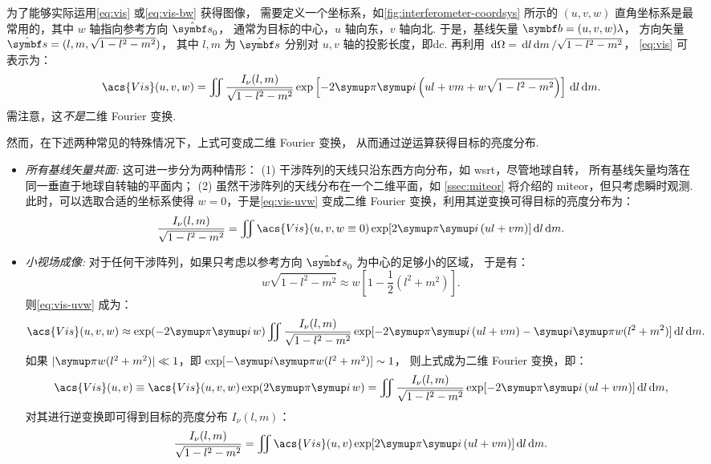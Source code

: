 为了能够实际运用\autoref{eq:vis} 或\autoref{eq:vis-bw} 获得图像，
需要定义一个坐标系，如\autoref{fig:interferometer-coordsys}
所示的 $(u,v,w)$ 直角坐标系是最常用的，其中 $w$ 轴指向参考方向 $\hat{\B{s}}_0$，
通常为目标的中心，$u$ 轴向东，$v$ 轴向北.
于是，基线矢量 $\B{b} = (u,v,w) \lambda$，
方向矢量 $\hat{\B{s}} = (l,m,\sqrt{1-l^2-m^2})$，
其中 $l, m$ 为 $\hat{\B{s}}$ 分别对 $u, v$ 轴的投影长度，即\ac{dc}.
再利用 $\,\mathrm{d}\Omega = \,\mathrm{d}l\,\mathrm{d}m \,/ \sqrt{1-l^2-m^2}$，
\autoref{eq:vis} 可表示为：
\begin{equation}
  \label{eq:vis-uvw}
  \acs{Vis}(u,v,w) = \iint \frac{I_{\nu}(l,m)}{\sqrt{1-l^2-m^2}}
    \exp \left[ -2\Cpi\Ci \left( ul+vm+w\sqrt{1-l^2-m^2} \right) \right]
    \D{l}\D{m}.
\end{equation}
需注意，这\emph{不是}二维 Fourier 变换.

然而，在下述两种常见的特殊情况下，上式可变成二维 Fourier 变换，
从而通过逆运算获得目标的亮度分布.
\begin{itemize}
\item
\emph{所有基线矢量共面:}
这可进一步分为两种情形：
(1) 干涉阵列的天线只沿东西方向分布，如 \ac{wsrt}，尽管地球自转，
所有基线矢量均落在同一垂直于地球自转轴的平面内；
(2) 虽然干涉阵列的天线分布在一个二维平面，如 \autoref{ssec:miteor}
将介绍的 \ac*{miteor}，但只考虑瞬时观测.
此时，可以选取合适的坐标系使得 $w = 0$，于是\autoref{eq:vis-uvw}
变成二维 Fourier 变换，利用其逆变换可得目标的亮度分布为：
\begin{equation}
  \label{eq:vis-inv1}
  \frac{I_{\nu}(l,m)}{\sqrt{1-l^2-m^2}} = \iint \acs{Vis}(u,v, w \equiv 0)
    \exp [2\Cpi\Ci\, (ul+vm)] \D{l}\D{m}.
\end{equation}

\item
\emph{小视场成像:}
对于任何干涉阵列，如果只考虑以参考方向 $\hat{\B{s}}_0$ 为中心的足够小的区域，
于是有：
\begin{equation}
  w\sqrt{1-l^2-m^2} \approx w \left[ 1 - \frac{1}{2} (l^2+m^2) \right].
\end{equation}
则\autoref{eq:vis-uvw} 成为：
\begin{equation}
  \acs{Vis}(u,v,w) \approx \exp (-2\Cpi\Ci\,w) \iint
    \frac{I_{\nu}(l,m)}{\sqrt{1-l^2-m^2}}
    \exp [-2\Cpi\Ci\, (ul+vm) -\Ci\Cpi w(l^2+m^2)] \D{l}\D{m}.
\end{equation}
如果 $|\Cpi w(l^2+m^2)| \ll 1$，即 $\exp [-\Ci\Cpi w(l^2+m^2)] \sim 1$，
则上式成为二维 Fourier 变换，即：
\begin{equation}
  \acs{Vis}(u,v) \equiv \acs{Vis}(u,v,w) \exp (2\Cpi\Ci\,w)
    = \iint \frac{I_{\nu}(l,m)}{\sqrt{1-l^2-m^2}}
    \exp [-2\Cpi\Ci\, (ul+vm)] \D{l}\D{m},
\end{equation}
对其进行逆变换即可得到目标的亮度分布 $I_{\nu}(l,m)$：
\begin{equation}
  \label{eq:vis-inv2}
  \frac{I_{\nu}(l,m)}{\sqrt{1-l^2-m^2}} = \iint \acs{Vis}(u,v)
    \exp [2\Cpi\Ci\, (ul+vm)] \D{l}\D{m}.
\end{equation}

\end{itemize}


